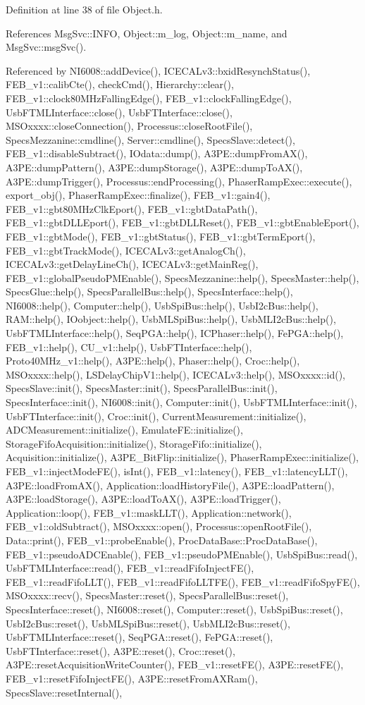 Definition at line 38 of file Object.h.

References MsgSvc::INFO, Object::m\_\-log, Object::m\_\-name, and MsgSvc::msgSvc().

Referenced by NI6008::addDevice(), ICECALv3::bxidResynchStatus(), FEB\_\-v1::calibCte(), checkCmd(), Hierarchy::clear(), FEB\_\-v1::clock80MHzFallingEdge(), FEB\_\-v1::clockFallingEdge(), UsbFTMLInterface::close(), UsbFTInterface::close(), MSOxxxx::closeConnection(), Processus::closeRootFile(), SpecsMezzanine::cmdline(), Server::cmdline(), SpecsSlave::detect(), FEB\_\-v1::disableSubtract(), IOdata::dump(), A3PE::dumpFromAX(), A3PE::dumpPattern(), A3PE::dumpStorage(), A3PE::dumpToAX(), A3PE::dumpTrigger(), Processus::endProcessing(), PhaserRampExec::execute(), export\_\-obj(), PhaserRampExec::finalize(), FEB\_\-v1::gain4(), FEB\_\-v1::gbt80MHzClkEport(), FEB\_\-v1::gbtDataPath(), FEB\_\-v1::gbtDLLEport(), FEB\_\-v1::gbtDLLReset(), FEB\_\-v1::gbtEnableEport(), FEB\_\-v1::gbtMode(), FEB\_\-v1::gbtStatus(), FEB\_\-v1::gbtTermEport(), FEB\_\-v1::gbtTrackMode(), ICECALv3::getAnalogCh(), ICECALv3::getDelayLineCh(), ICECALv3::getMainReg(), FEB\_\-v1::globalPseudoPMEnable(), SpecsMezzanine::help(), SpecsMaster::help(), SpecsGlue::help(), SpecsParallelBus::help(), SpecsInterface::help(), NI6008::help(), Computer::help(), UsbSpiBus::help(), UsbI2cBus::help(), RAM::help(), IOobject::help(), UsbMLSpiBus::help(), UsbMLI2cBus::help(), UsbFTMLInterface::help(), SeqPGA::help(), ICPhaser::help(), FePGA::help(), FEB\_\-v1::help(), CU\_\-v1::help(), UsbFTInterface::help(), Proto40MHz\_\-v1::help(), A3PE::help(), Phaser::help(), Croc::help(), MSOxxxx::help(), LSDelayChipV1::help(), ICECALv3::help(), MSOxxxx::id(), SpecsSlave::init(), SpecsMaster::init(), SpecsParallelBus::init(), SpecsInterface::init(), NI6008::init(), Computer::init(), UsbFTMLInterface::init(), UsbFTInterface::init(), Croc::init(), CurrentMeasurement::initialize(), ADCMeasurement::initialize(), EmulateFE::initialize(), StorageFifoAcquisition::initialize(), StorageFifo::initialize(), Acquisition::initialize(), A3PE\_\-BitFlip::initialize(), PhaserRampExec::initialize(), FEB\_\-v1::injectModeFE(), isInt(), FEB\_\-v1::latency(), FEB\_\-v1::latencyLLT(), A3PE::loadFromAX(), Application::loadHistoryFile(), A3PE::loadPattern(), A3PE::loadStorage(), A3PE::loadToAX(), A3PE::loadTrigger(), Application::loop(), FEB\_\-v1::maskLLT(), Application::network(), FEB\_\-v1::oldSubtract(), MSOxxxx::open(), Processus::openRootFile(), Data::print(), FEB\_\-v1::probeEnable(), ProcDataBase::ProcDataBase(), FEB\_\-v1::pseudoADCEnable(), FEB\_\-v1::pseudoPMEnable(), UsbSpiBus::read(), UsbFTMLInterface::read(), FEB\_\-v1::readFifoInjectFE(), FEB\_\-v1::readFifoLLT(), FEB\_\-v1::readFifoLLTFE(), FEB\_\-v1::readFifoSpyFE(), MSOxxxx::recv(), SpecsMaster::reset(), SpecsParallelBus::reset(), SpecsInterface::reset(), NI6008::reset(), Computer::reset(), UsbSpiBus::reset(), UsbI2cBus::reset(), UsbMLSpiBus::reset(), UsbMLI2cBus::reset(), UsbFTMLInterface::reset(), SeqPGA::reset(), FePGA::reset(), UsbFTInterface::reset(), A3PE::reset(), Croc::reset(), A3PE::resetAcquisitionWriteCounter(), FEB\_\-v1::resetFE(), A3PE::resetFE(), FEB\_\-v1::resetFifoInjectFE(), A3PE::resetFromAXRam(), SpecsSlave::resetInternal(), 